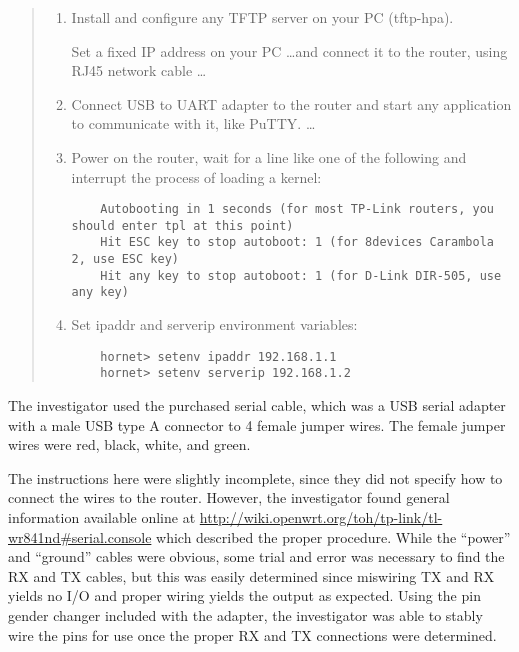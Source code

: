 \begin{quotation}
  \begin{enumerate}

    \item Install and configure any TFTP server on your PC (tftp-hpa).

       Set a fixed IP address on your PC \ldots and connect it to the router,
       using RJ45 network cable \ldots

 \item Connect USB to UART adapter to the router and start any application to
   communicate with it, like PuTTY. \ldots

   \item Power on the router, wait for a line like one of the following and
     interrupt the process of loading a kernel:
\begin{verbatim}
    Autobooting in 1 seconds (for most TP-Link routers, you should enter tpl at this point)
    Hit ESC key to stop autoboot: 1 (for 8devices Carambola 2, use ESC key)
    Hit any key to stop autoboot: 1 (for D-Link DIR-505, use any key)
\end{verbatim}
\item   Set ipaddr and serverip environment variables:
\lstset{tabsize=2}
\begin{lstlisting}
    hornet> setenv ipaddr 192.168.1.1
    hornet> setenv serverip 192.168.1.2
\end{lstlisting}

  \end{enumerate}
\end{quotation}



The investigator used the purchased serial cable, which was a USB serial
adapter with a male USB type A connector to 4 female jumper wires.  The
female jumper wires were red, black, white, and green.

The instructions here were slightly incomplete, since they did not specify
how to connect the wires to the router.  However, the investigator found
general information available online at
\url{http://wiki.openwrt.org/toh/tp-link/tl-wr841nd#serial.console} which
described the proper procedure.  While the ``power'' and ``ground'' cables
were obvious, some trial and error was necessary to find the RX and TX
cables, but this was easily determined since miswiring TX and RX yields no
I/O and proper wiring yields the output as expected.  Using the pin gender
changer included with the adapter, the investigator was able to stably wire
the pins for use once the proper RX and TX connections were determined.

